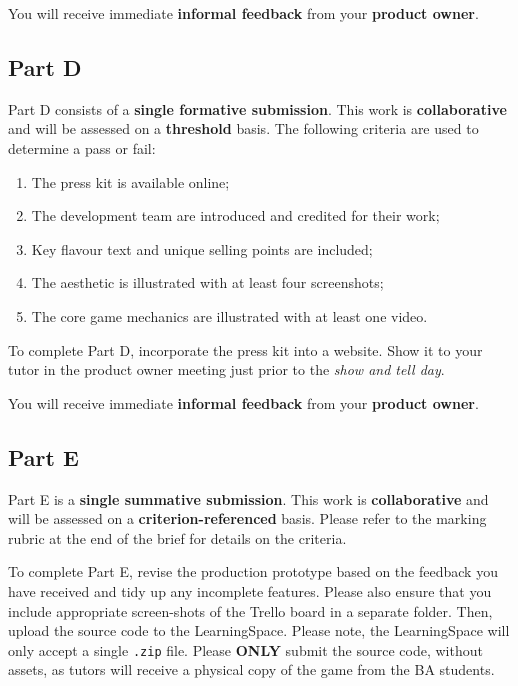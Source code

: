 \documentclass{../fal_assignment}
\begin{document}
You will receive immediate \textbf{informal feedback} from your \textbf{product owner}.

\subsection*{Part D}

Part D consists of a \textbf{single formative submission}. This work is \textbf{collaborative} and will be assessed on a \textbf{threshold} basis. The following criteria are used to determine a pass or fail:

\begin{enumerate}[label=(\alph*)]
	\item The press kit is available online;
	\item The development team are introduced and credited for their work;
	\item Key flavour text and unique selling points are included;
	\item The aesthetic is illustrated with at least four screenshots;
	\item The core game mechanics are illustrated with at least one video.
\end{enumerate}

To complete Part D, incorporate the press kit into a website. Show it to your tutor in the product owner meeting just prior to the \textit{show and tell day}.

You will receive immediate \textbf{informal feedback} from your \textbf{product owner}.


\subsection*{Part E}

Part E is a \textbf{single summative submission}. This work is \textbf{collaborative} and will be assessed on a \textbf{criterion-referenced} basis. Please refer to the marking rubric at the end of the brief for details on the criteria.

To complete Part E, revise the production prototype based on the feedback you have received and tidy up any incomplete features. Please also ensure that you include appropriate screen-shots of the Trello board in a separate folder. Then, upload the source code to the LearningSpace. Please note, the LearningSpace will only accept a single \texttt{.zip} file. Please \textbf{ONLY} submit the source code, without assets, as tutors will receive a physical copy of the game from the BA students.
\end{document}
